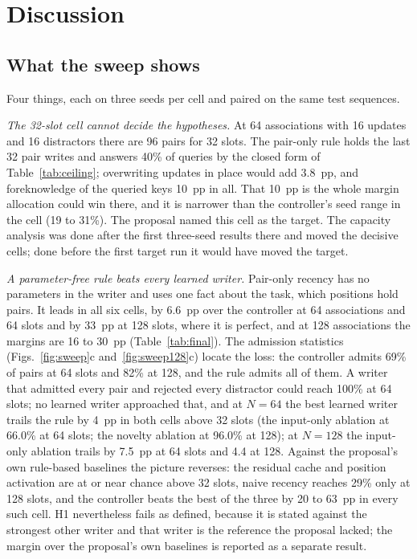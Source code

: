 \documentclass[conference]{IEEEtran}
\begin{document}
\section{Discussion}
\label{sec:discussion}

\subsection{What the sweep shows}

Four things, each on three seeds per cell and paired on the same test
sequences.

\textit{The 32-slot cell cannot decide the hypotheses.} At 64 associations
with 16 updates and 16 distractors there are 96 pairs for 32 slots. The
pair-only rule holds the last 32 pair writes and answers 40\% of queries by
the closed form of Table~\ref{tab:ceiling}; overwriting updates in place would
add 3.8~pp, and foreknowledge of the queried keys 10~pp in all. That 10~pp is
the whole margin allocation could win there, and it is narrower than the
controller's seed range in the cell (19 to 31\%). The proposal named this cell
as the target. The capacity analysis was done after the first three-seed
results there and moved the decisive cells; done before the first target run
it would have moved the target.

\textit{A parameter-free rule beats every learned writer.} Pair-only recency
has no parameters in the writer and uses one fact about the task, which
positions hold pairs. It leads in all six cells, by 6.6~pp over the controller
at 64 associations and 64 slots and by 33~pp at 128 slots, where it is perfect,
and at 128 associations the margins are 16 to 30~pp (Table~\ref{tab:final}). The admission
statistics (Figs.~\ref{fig:sweep}c and~\ref{fig:sweep128}c) locate the loss:
the controller admits 69\% of pairs at 64 slots and 82\% at 128, and the rule
admits all of them. A writer that admitted every pair and rejected every
distractor could reach 100\% at 64 slots; no learned writer approached that,
and at $N = 64$ the best learned writer trails the rule by 4~pp in both
cells above 32 slots (the input-only ablation at 66.0\% at 64 slots; the
novelty ablation at 96.0\% at 128); at $N = 128$ the input-only ablation
trails by 7.5~pp at 64 slots and 4.4 at 128. Against the proposal's own
rule-based baselines the picture reverses: the
residual cache and position activation are at or near chance above 32 slots,
naive recency reaches 29\% only at 128 slots, and the controller beats the
best of the three by 20 to 63~pp in every such cell. H1 nevertheless fails as defined, because it is stated against the
strongest other writer and that writer is the reference the proposal lacked; the margin over the proposal's own baselines is reported
as a separate result.
\end{document}
